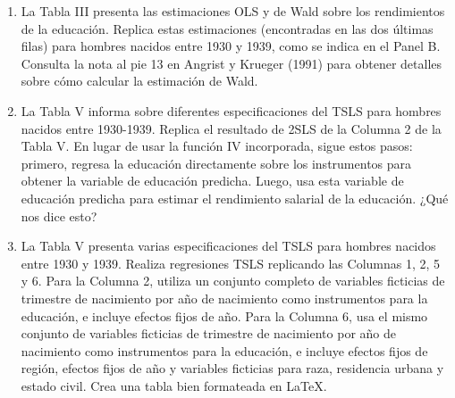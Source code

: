 \documentclass[11pt,a4paper,english]{article}
\begin{document}
\begin{enumerate}
    \item La Tabla III presenta las estimaciones OLS y de Wald sobre los rendimientos de la educación. Replica estas estimaciones (encontradas en las dos últimas filas) para hombres nacidos entre 1930 y 1939, como se indica en el Panel B. Consulta la nota al pie 13 en Angrist y Krueger (1991) para obtener detalles sobre cómo calcular la estimación de Wald.
    \item La Tabla V informa sobre diferentes especificaciones del TSLS para hombres nacidos entre 1930-1939. Replica el resultado de 2SLS de la Columna 2 de la Tabla V. En lugar de usar la función IV incorporada, sigue estos pasos: primero, regresa la educación directamente sobre los instrumentos para obtener la variable de educación predicha. Luego, usa esta variable de educación predicha para estimar el rendimiento salarial de la educación. ¿Qué nos dice esto?
    \item La Tabla V presenta varias especificaciones del TSLS para hombres nacidos entre 1930 y 1939. Realiza regresiones TSLS replicando las Columnas 1, 2, 5 y 6. Para la Columna 2, utiliza un conjunto completo de variables ficticias de trimestre de nacimiento por año de nacimiento como instrumentos para la educación, e incluye efectos fijos de año. Para la Columna 6, usa el mismo conjunto de variables ficticias de trimestre de nacimiento por año de nacimiento como instrumentos para la educación, e incluye efectos fijos de región, efectos fijos de año y variables ficticias para raza, residencia urbana y estado civil. Crea una tabla bien formateada en LaTeX.
\end{enumerate}
\end{document}
